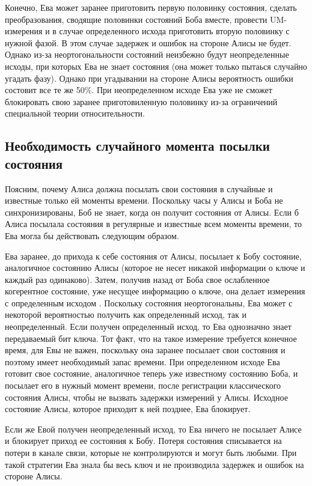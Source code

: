 Конечно, Ева может заранее приготовить первую половинку состояния, сделать преобразования, сводящие половинки состояний Боба вместе, провести UM-измерения и в случае определенного исхода приготовить вторую половинку с нужной фазой. В этом случае задержек и ошибок на стороне Алисы не будет. Однако из-за неортогональности состояний неизбежно будут неопределенные исходы, при которых Ева не знает состояния (она может только пытаься случайно угадать фазу). Однако при угадывании на стороне Алисы вероятность ошибки состовит все те же 50\%. При неопределенном исходе Ева уже не сможет блокировать свою заранее приготовиленную половинку из-за ограничений специальной теории относительности.

\subsection{Необходимость случайного момента посылки состояния}
Поясним, почему Алиса должна посылать свои состояния в случайные и известные только ей моменты времени. Поскольку часы у Алисы и Боба не синхронизированы, Боб не знает, когда он получит состояния от Алисы. Если б Алиса посылала состояния в регулярные и известные всем моменты времени, то Ева могла бы действовать следующим образом.

Ева заранее, до прихода к себе состояния от Алисы, посылает к Бобу состояние, аналогичное состоянию Алисы (которое не несет никакой информации о ключе и каждый раз одинаково). 
Затем, получив назад от Боба свое ослабленное когерентное состояние, уже несущее информацию о ключе, она делает измерения с определенным исходом \cite{scarani2009secpraquakeydis}. 
Поскольку состояния неортогональны, Ева может с некоторой вероятностью получить как определенный исход, так и неопределенный. 
Если получен определенный исход, то Ева однозначно знает передаваемый бит ключа. 
Тот факт, что на такое измерение требуется конечное время, для Евы не важен, поскольку она заранее посылает свои состояния и поэтому имеет необходимый запас времени. 
При определенном исходе Ева готовит свое состояние, аналогичное теперь уже известному состоянию Боба, и посылает его в нужный момент времени, после регистрации классического состояния Алисы, чтобы не вызвать задержки измерений у Алисы. 
Исходное состояние Алисы, которое приходит к ней позднее, Ева блокирует.

Если же Евой получен неопределенный исход, то Ева ничего не посылает Алисе и блокирует приход ее состояния к Бобу. 
Потеря состояния списывается на потери в канале связи, которые не контролируются и могут быть любыми. 
При такой стратегии Ева знала бы весь ключ и не производила задержек и ошибок на стороне Алисы.

